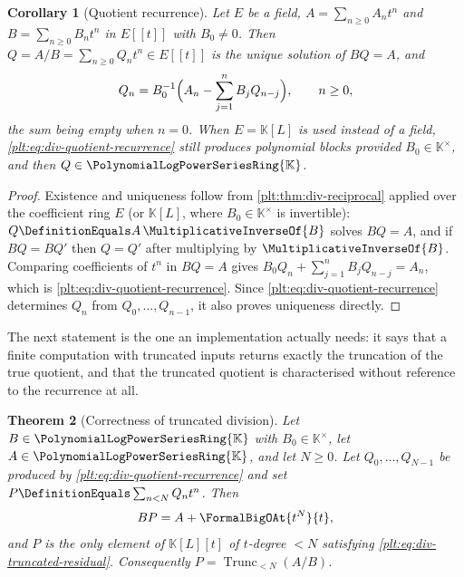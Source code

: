 \documentclass[11pt,oneside]{article}
\theoremstyle{plain}
\newtheorem{theorem}{Theorem}[section]
\newtheorem{corollary}[theorem]{Corollary}
\theoremstyle{definition}
\theoremstyle{remark}
\newcommand{\K}{\mathbb{K}}
\newcommand{\PLpow}{\PolynomialLogPowerSeriesRing{\K}}   %
\newcommand{\Trunc}[2]{\operatorname{Trunc}_{<#2}#1}     %
\newcommand{\recip}[1]{\MultiplicativeInverseOf{#1}}
\begin{document}
\begin{corollary}[Quotient recurrence]\label{plt:cor:div-quotient}
Let \(E\) be a field, \(A=\sum_{n\ge0}A_{n}t^{n}\) and
\(B=\sum_{n\ge0}B_{n}t^{n}\) in \(E[[t]]\) with \(B_{0}\ne0\).  Then
\(Q=A/B=\sum_{n\ge0}Q_{n}t^{n}\in E[[t]]\) is the unique solution of \(BQ=A\),
and
\begin{equation}\label{plt:eq:div-quotient-recurrence}
  Q_{n}=B_{0}^{-1}\Bigl(A_{n}-\sum_{j=1}^{n}B_{j}Q_{n-j}\Bigr),
  \qquad n\ge0,
\end{equation}
the sum being empty when \(n=0\).  When \(E=\K[L]\) is used instead of a field,
\cref{plt:eq:div-quotient-recurrence} still produces polynomial blocks provided
\(B_{0}\in\K^{\times}\), and then \(Q\in\PLpow\).
\end{corollary}

\begin{proof}
Existence and uniqueness follow from \cref{plt:thm:div-reciprocal} applied over
the coefficient ring \(E\) (or \(\K[L]\), where \(B_{0}\in\K^{\times}\) is
invertible): \(Q\DefinitionEquals A\,\recip{B}\) solves \(BQ=A\), and if
\(BQ=BQ'\) then \(Q=Q'\) after multiplying by \(\recip{B}\).  Comparing
coefficients of \(t^{n}\) in \(BQ=A\) gives
\(B_{0}Q_{n}+\sum_{j=1}^{n}B_{j}Q_{n-j}=A_{n}\), which is
\cref{plt:eq:div-quotient-recurrence}.  Since
\cref{plt:eq:div-quotient-recurrence} determines \(Q_{n}\) from
\(Q_{0},\dots,Q_{n-1}\), it also proves uniqueness directly.
\end{proof}

The next statement is the one an implementation actually needs: it says that a
finite computation with truncated inputs returns exactly the truncation of the
true quotient, and that the truncated quotient is characterised without
reference to the recurrence at all.

\begin{theorem}[Correctness of truncated division]
\label{plt:thm:div-truncated}
Let \(B\in\PLpow\) with \(B_{0}\in\K^{\times}\), let \(A\in\PLpow\), and let
\(N\ge0\).  Let \(Q_{0},\dots,Q_{N-1}\) be produced by
\cref{plt:eq:div-quotient-recurrence} and set
\(P\DefinitionEquals\sum_{n<N}Q_{n}t^{n}\).  Then
\begin{equation}\label{plt:eq:div-truncated-residual}
  BP=A+\FormalBigOAt{t^{N}}{t},
\end{equation}
and \(P\) is the \emph{only} element of \(\K[L][t]\) of \(t\)-degree \(<N\)
satisfying \cref{plt:eq:div-truncated-residual}.  Consequently
\(P=\Trunc{(A/B)}{N}\).
\end{theorem}
\end{document}
